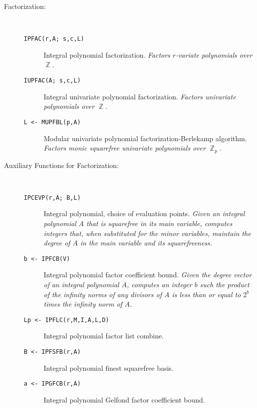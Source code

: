 \begin{description}

\item[Factorization:] \ \
  \begin{description}

  \item[{\tt  IPFAC(r,A; s,c,L) 
}] Integral polynomial factorization. {\em Factors
$r$-variate polynomials over $\BbbZ$.}

  \item[{\tt  IUPFAC(A; s,c,L) 
}] Integral univariate polynomial factorization. {\em
Factors univariate polynomials over $\BbbZ$.}

  \item[{\tt L <- MUPFBL(p,A) 
}] Modular univariate polynomial factorization-Berlekamp
                algorithm. {\em Factors monic squarefree univariate
                polynomials over $\BbbZ_p$.}

  \end{description} %

\item[Auxiliary Functions for Factorization:] \ \
  \begin{description}

  \item[{\tt  IPCEVP(r,A; B,L) 
}] Integral polynomial, choice of evaluation points. {\em
Given an integral polynomial $A$ that is squarefree in its main
variable, computes integers that, when substituted for the minor
variables, maintain the degree of $A$ in the main variable and its
squarefreeness.}

  \item[{\tt b <- IPFCB(V) 
}] Integral polynomial factor coefficient bound. {\em
Given the degree vector of an integral polynomial $A$, computes an
integer $b$ such the product of the infinity norms of any divisors of
$A$ is less than or equal to $2^b$ times the infinity norm of $A$.}

  \item[{\tt Lp <- IPFLC(r,M,I,A,L,D) 
}] Integral polynomial factor list combine.

  \item[{\tt B <- IPFSFB(r,A) 
}] Integral polynomial finest squarefree basis.

  \item[{\tt a <- IPGFCB(r,A) 
}] Integral polynomial Gelfond factor coefficient bound.


\end{description}
\end{description}
